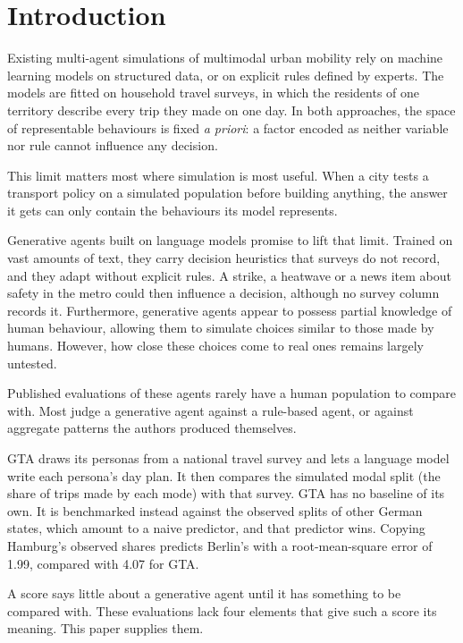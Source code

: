 \section{Introduction}
\label{sec:intro}

\label{sec:promise}

Existing multi-agent simulations of multimodal urban mobility rely on machine learning models
on structured data, or on explicit rules defined by experts. The models are fitted on household
travel surveys, in which the residents of one territory describe every trip they made on one
day. In both approaches, the space of representable behaviours is fixed \emph{a priori}: a
factor encoded as neither variable nor rule cannot influence any decision.

This limit matters most where simulation is most useful. When a city tests a transport policy
on a simulated population before building anything, the answer it gets can only contain the
behaviours its model represents.

Generative agents built on language models promise to lift that limit. Trained on vast amounts
of text, they carry decision heuristics that surveys do not record, and they adapt without
explicit rules. A strike, a heatwave or a news item about safety in the metro could then
influence a decision, although no survey column records it. Furthermore, generative agents
appear to possess partial knowledge of human behaviour, allowing them to simulate choices
similar to those made by humans. However, how close these choices come to real ones remains
largely untested.

\label{sec:gap}

Published evaluations of these agents rarely have a human population to compare with. Most
judge a generative agent against a rule-based agent, or against aggregate patterns the
authors produced themselves.

GTA \citep{lammer2026gta} draws its personas from a national travel survey and lets a language
model write each persona's day plan. It then compares the simulated modal split (the share of
trips made by each mode) with that survey. GTA has no baseline of its own. It is benchmarked
instead against the observed splits of other German states, which amount to a naive
predictor, and that predictor wins. Copying Hamburg's observed shares predicts Berlin's with a
root-mean-square error of 1.99, compared with 4.07 for GTA.

A score says little about a generative agent until it has something to be compared with.
These evaluations lack four elements that give such a score its meaning. This paper supplies
them.

